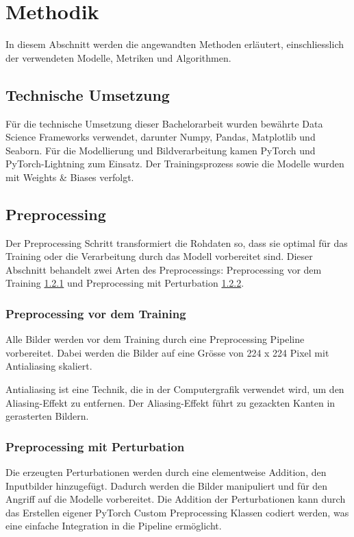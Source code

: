 \section{Methodik} 
In diesem Abschnitt werden die angewandten Methoden erläutert, einschliesslich der verwendeten Modelle, Metriken und Algorithmen.

\subsection{Technische Umsetzung} \label{chap:technische-umsetzung}
Für die technische Umsetzung dieser Bachelorarbeit wurden bewährte Data Science Frameworks verwendet, darunter Numpy, Pandas, Matplotlib und Seaborn. Für die Modellierung und Bildverarbeitung kamen PyTorch und PyTorch-Lightning zum Einsatz. Der Trainingsprozess sowie die Modelle wurden mit Weights \& Biases verfolgt.

\subsection{Preprocessing}  \label{chap:preprocessing}
Der Preprocessing Schritt transformiert die Rohdaten so, dass sie optimal für das Training oder die Verarbeitung durch das Modell vorbereitet sind. Dieser Abschnitt behandelt zwei Arten des Preprocessings: Preprocessing vor dem Training \ref{chap:Preprocessing vor dem Training} und Preprocessing mit Perturbation \ref{chap:Preprocessing mit Perturbation}.

\subsubsection{Preprocessing vor dem Training} \label{chap:Preprocessing vor dem Training}
Alle Bilder werden vor dem Training durch eine Preprocessing Pipeline vorbereitet. Dabei werden die Bilder auf eine Grösse von 224 x 224 Pixel mit Antialiasing skaliert.

Antialiasing ist eine Technik, die in der Computergrafik verwendet wird, um den Aliasing-Effekt zu entfernen. Der Aliasing-Effekt führt zu gezackten Kanten in gerasterten Bildern.

\subsubsection{Preprocessing mit Perturbation} \label{chap:Preprocessing mit Perturbation}
Die erzeugten Perturbationen werden durch eine elementweise Addition, den Inputbilder hinzugefügt. Dadurch werden die Bilder manipuliert und für den Angriff auf die Modelle vorbereitet. Die Addition der Perturbationen kann durch das Erstellen eigener PyTorch Custom Preprocessing Klassen codiert werden, was eine einfache Integration in die Pipeline ermöglicht.






